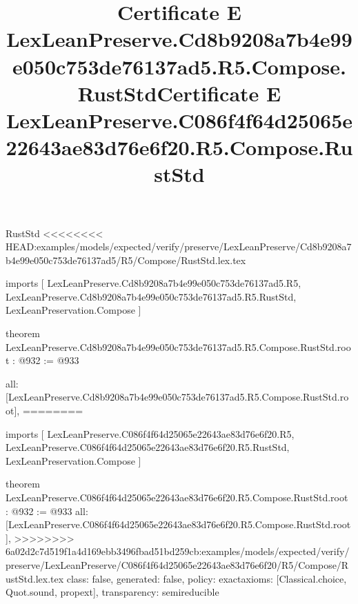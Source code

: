 \begin{lexlean}{RustStd}
<<<<<<<< HEAD:examples/models/expected/verify/preserve/LexLeanPreserve/Cd8b9208a7b4e99e050c753de76137ad5/R5/Compose/RustStd.lex.tex
\title{Certificate E LexLeanPreserve.Cd8b9208a7b4e99e050c753de76137ad5.R5.Compose.RustStd}
\begin{coremodule}
imports [
  LexLeanPreserve.Cd8b9208a7b4e99e050c753de76137ad5.R5,
  LexLeanPreserve.Cd8b9208a7b4e99e050c753de76137ad5.R5.RustStd,
  LexLeanPreservation.Compose
]

theorem LexLeanPreserve.Cd8b9208a7b4e99e050c753de76137ad5.R5.Compose.RustStd.root : @932 := @933 {
  all: [LexLeanPreserve.Cd8b9208a7b4e99e050c753de76137ad5.R5.Compose.RustStd.root],
========
\title{Certificate E LexLeanPreserve.C086f4f64d25065e22643ae83d76e6f20.R5.Compose.RustStd}
\begin{coremodule}
imports [
  LexLeanPreserve.C086f4f64d25065e22643ae83d76e6f20.R5,
  LexLeanPreserve.C086f4f64d25065e22643ae83d76e6f20.R5.RustStd,
  LexLeanPreservation.Compose
]

theorem LexLeanPreserve.C086f4f64d25065e22643ae83d76e6f20.R5.Compose.RustStd.root : @932 := @933 {
  all: [LexLeanPreserve.C086f4f64d25065e22643ae83d76e6f20.R5.Compose.RustStd.root],
>>>>>>>> 6a02d2c7d519f1a4d169ebb3496fbad51bd259cb:examples/models/expected/verify/preserve/LexLeanPreserve/C086f4f64d25065e22643ae83d76e6f20/R5/Compose/RustStd.lex.tex
  class: false,
  generated: false,
  policy: exact{axioms: [Classical.choice, Quot.sound, propext]},
  transparency: semireducible
}


\end{coremodule}}
\end{coremodule}
\end{lexlean}
